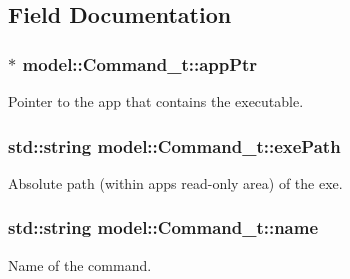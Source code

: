\subsection{Field Documentation}
\subsubsection[{\texorpdfstring{app\+Ptr}{appPtr}}]{$\ast$ model\+::\+Command\+\_\+t\+::app\+Ptr}\hypertarget{structmodel_1_1_command__t_aff20aa1ede1bb7858e57c8add49a47d8}{}\label{structmodel_1_1_command__t_aff20aa1ede1bb7858e57c8add49a47d8}


Pointer to the app that contains the executable. 

\subsubsection[{\texorpdfstring{exe\+Path}{exePath}}]{\setlength{\rightskip}{0pt plus 5cm}std\+::string model\+::\+Command\+\_\+t\+::exe\+Path}\hypertarget{structmodel_1_1_command__t_a57d87955724ba8604d9e567197174d07}{}\label{structmodel_1_1_command__t_a57d87955724ba8604d9e567197174d07}


Absolute path (within app\textquotesingle{}s read-\/only area) of the exe. 

\subsubsection[{\texorpdfstring{name}{name}}]{\setlength{\rightskip}{0pt plus 5cm}std\+::string model\+::\+Command\+\_\+t\+::name}\hypertarget{structmodel_1_1_command__t_a1edd4aef7fbe797e750364be9d2b7cac}{}\label{structmodel_1_1_command__t_a1edd4aef7fbe797e750364be9d2b7cac}


Name of the command. 


